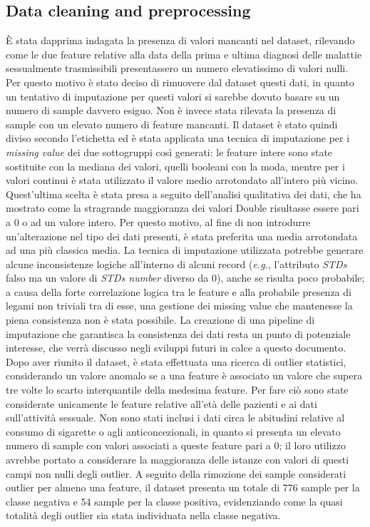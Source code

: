 \subsection{Data cleaning and preprocessing}
È stata dapprima indagata la presenza di valori mancanti nel dataset, rilevando come le due feature relative alla data della prima e ultima diagnosi delle malattie sessualmente trasmissibili presentassero un numero elevatissimo di valori nulli.
Per questo motivo è stato deciso di rimuovere dal dataset questi dati, in quanto un tentativo di imputazione per questi valori si sarebbe dovuto basare su un numero di sample davvero esiguo. Non è invece stata rilevata la presenza di sample con un elevato numero di feature mancanti.
Il dataset è stato quindi diviso secondo l'etichetta ed è stata applicata una tecnica di imputazione per i \textit{missing value} dei due sottogruppi così generati: le feature intere sono state sostituite con la mediana dei valori, quelli booleani con la moda, mentre per i valori continui è stata utilizzato il valore medio arrotondato all'intero più vicino.
Quest'ultima scelta è stata presa a seguito dell'analisi qualitativa dei dati, che ha mostrato come la stragrande maggioranza dei valori Double risultasse essere pari a 0 o ad un valore intero.
Per questo motivo, al fine di non introdurre un'alterazione nel tipo dei dati presenti, è stata preferita una media arrotondata ad una più classica media.
La tecnica di imputazione utilizzata potrebbe generare alcune inconsistenze logiche all'interno di alcuni record (\textit{e.g.}, l'attributo \textit{STDs} falso ma un valore di \textit{STDs number} diverso da 0), anche se risulta poco probabile; a causa della forte correlazione logica tra le feature e alla probabile presenza di legami non triviali tra di esse, una gestione dei missing value che mantenesse la piena consistenza non è stata possibile. 
La creazione di una pipeline di imputazione che garantisca la consistenza dei dati resta un punto di potenziale interesse, che verrà discusso negli sviluppi futuri in calce a questo documento.
Dopo aver riunito il dataset, è stata effettuata una ricerca di outlier statistici, considerando un valore anomalo se a una feature è associato un valore che supera tre volte lo scarto interquantile della medesima feature.
Per fare ciò sono state considerate unicamente le feature relative all'età delle pazienti e ai dati sull'attività sessuale. Non sono stati inclusi i dati circa le abitudini relative al consumo di sigarette o agli anticoncezionali, in quanto si presenta un elevato numero di sample con valori associati a queste feature pari a $0$; il loro utilizzo avrebbe portato a considerare la maggioranza delle istanze con valori di questi campi non nulli degli outlier.
A seguito della rimozione dei sample considerati outlier per almeno una feature, il dataset presenta un totale di 776 sample per la classe negativa e 54 sample per la classe positiva, evidenziando come la quasi totalità degli outlier sia stata individuata nella classe negativa.